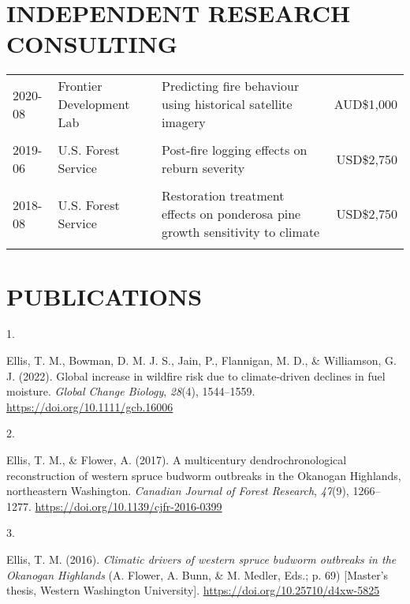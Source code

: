 \documentclass[11pt,a4paper,]{awesome-cv}
\newlength{\csllabelwidth}
\newcommand{\CSLLeftMargin}[1]{\parbox[t]{\csllabelwidth}{#1}}
\newcommand{\CSLRightInline}[1]{\parbox[t]{\linewidth - \csllabelwidth}{#1}}
\begin{document}
\hypertarget{independent-research-consulting}{%
\section{INDEPENDENT RESEARCH
CONSULTING}\label{independent-research-consulting}}

\begingroup\fontsize{6}{11}
\begin{tabular}{llp{9.3cm}r}
   \hline
2020-08 & Frontier Development Lab & Predicting fire behaviour using historical satellite imagery & AUD\$1,000 \\ 
   \\[-0.2cm]2019-06 & U.S. Forest Service & Post-fire logging effects on reburn severity & USD\$2,750 \\ 
   \\[-0.2cm]2018-08 & U.S. Forest Service & Restoration treatment effects on ponderosa pine growth sensitivity to climate & USD\$2,750 \\ 
   \\[-0.2cm] \hline
\end{tabular}
\endgroup

\hypertarget{publications}{%
\section{PUBLICATIONS}\label{publications}}

\hypertarget{bibliography}{}
\leavevmode{}%
\CSLLeftMargin{1. }
\CSLRightInline{Ellis, T. M., Bowman, D. M. J. S., Jain, P., Flannigan,
M. D., \& Williamson, G. J. (2022). Global increase in wildfire risk due
to climate-driven declines in fuel moisture. \emph{Global Change
Biology}, \emph{28}(4), 1544--1559.
\url{https://doi.org/10.1111/gcb.16006}}

\leavevmode{}%
\CSLLeftMargin{2. }
\CSLRightInline{Ellis, T. M., \& Flower, A. (2017). A multicentury
dendrochronological reconstruction of western spruce budworm outbreaks
in the Okanogan Highlands, northeastern Washington. \emph{Canadian
Journal of Forest Research}, \emph{47}(9), 1266--1277.
\url{https://doi.org/10.1139/cjfr-2016-0399}}

\leavevmode{}%
\CSLLeftMargin{3. }
\CSLRightInline{Ellis, T. M. (2016). \emph{Climatic drivers of western
spruce budworm outbreaks in the Okanogan Highlands} (A. Flower, A. Bunn,
\& M. Medler, Eds.; p. 69) {[}Master's thesis, Western Washington
University{]}. \url{https://doi.org/10.25710/d4xw-5825}}
\end{document}
